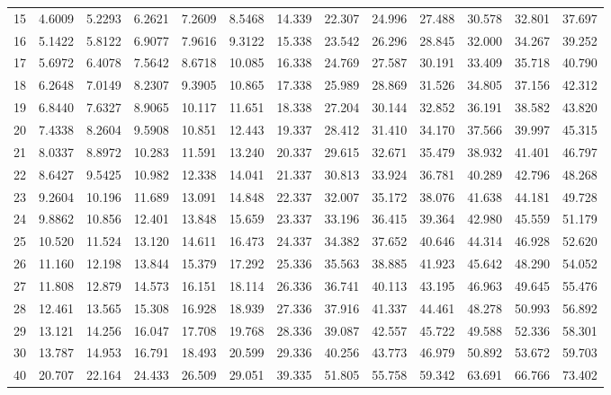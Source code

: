\begin{table}[htbp]
\begin{tabular}{ccccccccccccc}
		15  & 4.6009 & 5.2293 & 6.2621 & 7.2609 & 8.5468 & 14.339 & 22.307 & 24.996 & 27.488 & 30.578 & 32.801 & 37.697 \\
		16  & 5.1422 & 5.8122 & 6.9077 & 7.9616 & 9.3122 & 15.338 & 23.542 & 26.296 & 28.845 & 32.000 & 34.267 & 39.252 \\
		17  & 5.6972 & 6.4078 & 7.5642 & 8.6718 & 10.085 & 16.338 & 24.769 & 27.587 & 30.191 & 33.409 & 35.718 & 40.790 \\
		18  & 6.2648 & 7.0149 & 8.2307 & 9.3905 & 10.865 & 17.338 & 25.989 & 28.869 & 31.526 & 34.805 & 37.156 & 42.312 \\
		19  & 6.8440 & 7.6327 & 8.9065 & 10.117 & 11.651 & 18.338 & 27.204 & 30.144 & 32.852 & 36.191 & 38.582 & 43.820 \\[5pt]
		20  & 7.4338 & 8.2604 & 9.5908 & 10.851 & 12.443 & 19.337 & 28.412 & 31.410 & 34.170 & 37.566 & 39.997 & 45.315 \\
		21  & 8.0337 & 8.8972 & 10.283 & 11.591 & 13.240 & 20.337 & 29.615 & 32.671 & 35.479 & 38.932 & 41.401 & 46.797 \\
		22  & 8.6427 & 9.5425 & 10.982 & 12.338 & 14.041 & 21.337 & 30.813 & 33.924 & 36.781 & 40.289 & 42.796 & 48.268 \\
		23  & 9.2604 & 10.196 & 11.689 & 13.091 & 14.848 & 22.337 & 32.007 & 35.172 & 38.076 & 41.638 & 44.181 & 49.728 \\
		24  & 9.8862 & 10.856 & 12.401 & 13.848 & 15.659 & 23.337 & 33.196 & 36.415 & 39.364 & 42.980 & 45.559 & 51.179 \\
		25  & 10.520 & 11.524 & 13.120 & 14.611 & 16.473 & 24.337 & 34.382 & 37.652 & 40.646 & 44.314 & 46.928 & 52.620 \\
		26  & 11.160 & 12.198 & 13.844 & 15.379 & 17.292 & 25.336 & 35.563 & 38.885 & 41.923 & 45.642 & 48.290 & 54.052 \\
		27  & 11.808 & 12.879 & 14.573 & 16.151 & 18.114 & 26.336 & 36.741 & 40.113 & 43.195 & 46.963 & 49.645 & 55.476 \\
		28  & 12.461 & 13.565 & 15.308 & 16.928 & 18.939 & 27.336 & 37.916 & 41.337 & 44.461 & 48.278 & 50.993 & 56.892 \\
		29  & 13.121 & 14.256 & 16.047 & 17.708 & 19.768 & 28.336 & 39.087 & 42.557 & 45.722 & 49.588 & 52.336 & 58.301 \\[5pt]
		30  & 13.787 & 14.953 & 16.791 & 18.493 & 20.599 & 29.336 & 40.256 & 43.773 & 46.979 & 50.892 & 53.672 & 59.703 \\
		40  & 20.707 & 22.164 & 24.433 & 26.509 & 29.051 & 39.335 & 51.805 & 55.758 & 59.342 & 63.691 & 66.766 & 73.402 \\

\end{tabular}
\end{table}
